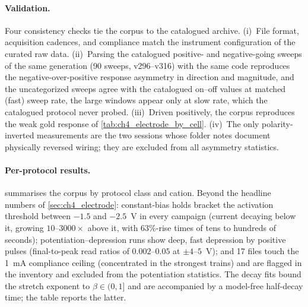 \paragraph{Validation.} Four consistency checks tie the corpus to the catalogued
archive. (i)~File format, acquisition cadences, and compliance match the
instrument configuration of the curated raw data. (ii)~Parsing the catalogued
positive- and negative-going sweeps of the same generation (\num{90} sweeps,
v296--v316) with the same code reproduces the negative-over-positive response
asymmetry in direction and magnitude, and the uncategorized sweeps agree with the
catalogued on--off values at matched (fast) sweep rate, the large windows
appear only at slow rate, which the catalogued protocol never probed.
(iii)~Driven positively, the corpus reproduces the weak gold response of
\cref{tab:ch4_electrode_by_cell}. (iv)~The only polarity-inverted measurements
are the two sessions whose folder notes document physically reversed wiring;
they are excluded from all asymmetry statistics.

\paragraph{Per-protocol results.}  summarises the
corpus by protocol class and cation. Beyond the headline numbers of
\cref{sec:ch4_electrode}: constant-bias holds bracket the activation threshold
between \(-1.5\) and \(-2.5\)~\si{\volt} in every campaign (current decaying
below it, growing \(10\)--\(3000\times\) above it, with \(63\%\)-rise times of
tens to hundreds of seconds); potentiation--depression runs show deep, fast
depression by positive pulses (final-to-peak read ratios of
\(0.002\)--\(0.05\) at \(\pm4\)--\(5\)~\si{\volt}); and \num{17} files touch
the \SI{1}{\milli\ampere} compliance ceiling (concentrated in the
strongest  trains) and are flagged in the inventory and excluded from the
potentiation statistics. The decay fits bound the stretch exponent to
\(\beta\in(0,1]\) and are accompanied by a model-free half-decay time; the table
reports the latter.

